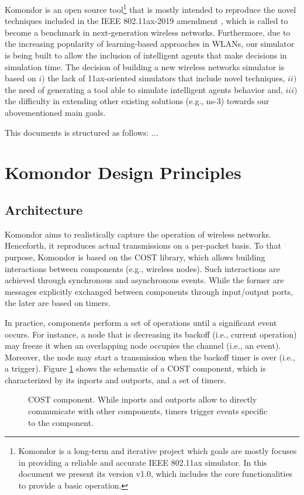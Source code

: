 \documentclass[a4paper]{article}
\begin{document}
Komondor is an open source tool\footnote{Komondor is a long-term and iterative project which goals are mostly focuses in providing a reliable and accurate IEEE 802.11ax simulator. In this document we present its version v1.0, which includes the core functionalities to provide a basic operation.} that is mostly intended to reproduce the novel techniques included in the IEEE 802.11ax-2019 amendment \cite{tgax2017draft}, which is called to become a benchmark in next-generation wireless networks. Furthermore, due to the increasing popularity of learning-based approaches in WLANs, our simulator is being built to allow the inclusion of intelligent agents that make decisions in simulation time. The decision of building a new wireless networks simulator is based on $i)$ the lack of 11ax-oriented simulators that include novel techniques, $ii)$ the need of generating a tool able to simulate intelligent agents behavior and, $iii)$ the difficulty in extending other existing solutions (e.g., ns-3) towards our abovementioned main goals. 	
	
This documents is structured as follows: ...
	
\section{Komondor Design Principles}
\label{section:system_model}

\subsection{Architecture}
Komondor aims to realistically capture the operation of wireless networks. Henceforth, it reproduces actual transmissions on a per-packet basis. To that purpose, Komondor is based on the COST library, which allows building interactions between components (e.g., wireless nodes). Such interactions are achieved through synchronous and asynchronous events. While the former are messages explicitly exchanged between components through input/output ports, the later are based on timers. 

In practice, components perform a set of operations until a significant event occurs. For instance, a node that is decreasing its backoff (i.e., current operation) may freeze it when an overlapping node occupies the channel (i.e., an event). Moreover, the node may start a transmission when the backoff timer is over (i.e., a trigger). Figure \ref{fig:cost} shows the schematic of a COST component, which is characterized by its inports and outports, and a set of timers. 
\begin{figure}[h!]
	\centering
	\caption{COST component. While inports and outports allow to directly communicate with other components, timers trigger events specific to the component.}
	\label{fig:cost}
\end{figure}		
\end{document}
